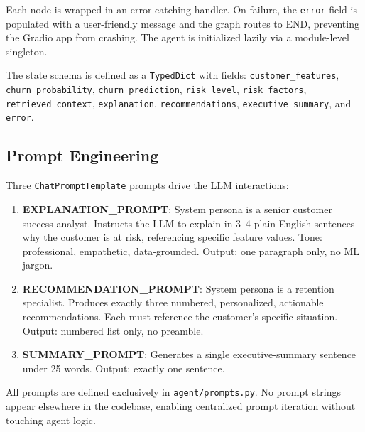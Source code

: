 Each node is wrapped in an error-catching handler. On failure, the \texttt{error} field is
populated with a user-friendly message and the graph routes to END, preventing the Gradio
app from crashing. The agent is initialized lazily via a module-level singleton.

The state schema is defined as a \texttt{TypedDict} with fields: \texttt{customer\_features},
\texttt{churn\_probability}, \texttt{churn\_prediction}, \texttt{risk\_level},
\texttt{risk\_factors}, \texttt{retrieved\_context}, \texttt{explanation},
\texttt{recommendations}, \texttt{executive\_summary}, and \texttt{error}.

\subsection{Prompt Engineering}
\label{sec:prompts}

Three \texttt{ChatPromptTemplate} prompts drive the LLM interactions:

\begin{enumerate}[leftmargin=*]
    \item \textbf{EXPLANATION\_PROMPT}: System persona is a senior customer success analyst.
        Instructs the LLM to explain in 3--4 plain-English sentences why the customer is at
        risk, referencing specific feature values. Tone: professional, empathetic, data-grounded.
        Output: one paragraph only, no ML jargon.
    \item \textbf{RECOMMENDATION\_PROMPT}: System persona is a retention specialist. Produces
        exactly three numbered, personalized, actionable recommendations. Each must reference
        the customer's specific situation. Output: numbered list only, no preamble.
    \item \textbf{SUMMARY\_PROMPT}: Generates a single executive-summary sentence under 25
        words. Output: exactly one sentence.
\end{enumerate}

All prompts are defined exclusively in \texttt{agent/prompts.py}. No prompt strings appear
elsewhere in the codebase, enabling centralized prompt iteration without touching agent logic.
